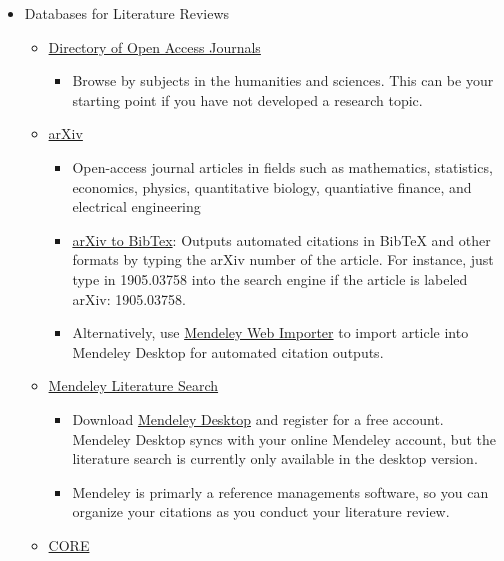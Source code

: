 \documentclass[]{book}
\providecommand{\tightlist}{%
  \setlength{\itemsep}{0pt}\setlength{\parskip}{0pt}}
\begin{document}
\begin{itemize}
\item
  Databases for Literature Reviews

  \begin{itemize}
  \tightlist
  \item
    \href{https://doaj.org/subjects}{Directory of Open Access Journals}

    \begin{itemize}
    \tightlist
    \item
      Browse by subjects in the humanities and sciences. This can be your starting point if you have not developed a research topic.
    \end{itemize}
  \item
    \href{https://arxiv.org/}{arXiv}

    \begin{itemize}
    \tightlist
    \item
      Open-access journal articles in fields such as mathematics, statistics, economics, physics, quantitative biology, quantiative finance, and electrical engineering
    \item
      \href{https://arxiv2bibtex.org}{arXiv to BibTex}: Outputs automated citations in BibTeX and other formats by typing the arXiv number of the article. For instance, just type in 1905.03758 into the search engine if the article is labeled arXiv: 1905.03758.
    \item
      Alternatively, use \href{https://www.mendeley.com/reference-management/web-importer\#id_2}{Mendeley Web Importer} to import article into Mendeley Desktop for automated citation outputs.
    \end{itemize}
  \item
    \href{https://blog.mendeley.com/2013/07/08/new-release-literature-search-from-within-mendeley-deskop/}{Mendeley Literature Search}

    \begin{itemize}
    \tightlist
    \item
      Download \href{https://www.mendeley.com/download-desktop/}{Mendeley Desktop} and register for a free account. Mendeley Desktop syncs with your online Mendeley account, but the literature search is currently only available in the desktop version.
    \item
      Mendeley is primarly a reference managements software, so you can organize your citations as you conduct your literature review.
    \end{itemize}
  \item
    \href{https://core.ac.uk/}{CORE}


\end{itemize}
\end{itemize}
\end{document}
